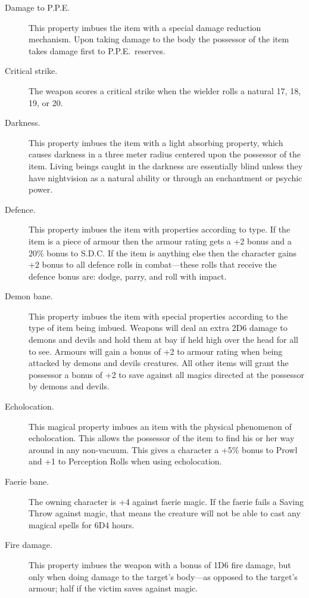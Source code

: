 \begin{description}
\item[Damage to P.P.E.] This property imbues the item with a special damage reduction
mechanism.
Upon taking damage to the body the possessor of
the item takes damage first to P.P.E.\ reserves.

\item[Critical strike.]
The weapon scores a critical strike when the wielder
rolls a natural 17, 18, 19, or 20.

\item[Darkness.] This property imbues the item with a light absorbing property,
which causes darkness in a three meter radius centered upon the possessor of the
item. Living beings caught in the darkness are essentially blind unless they have
nightvision as a natural ability or through an enchantment or psychic power.

\item[Defence.] This property imbues the item with properties according to type.
If the item is a piece of armour then the armour rating gets a +2 bonus and a 20\%
bonus to S.D.C.
If the item is anything else then the character gains +2 bonus to all defence rolls
in combat---these rolls that receive the defence bonus
are: dodge, parry, and roll with impact.

\item[Demon bane.] This property imbues the item with special properties according
to the type of item being imbued.
Weapons will deal an extra 2D6 damage to demons and devils and hold them at bay if
held high over the head for all to see.
Armours will gain a bonus of +2 to armour rating when being attacked by demons and devils
creatures.
All other items will grant the possessor a bonus of +2 to save against all magics
directed at the possessor
by demons and devils.

\item[Echolocation.]
This magical property imbues an item with the
physical phenomenon of echolocation.
This allows the possessor of the item to find
his or her way around in any non-vacuum.
This gives a character a +5\% bonus to Prowl
and +1 to Perception Rolls when using echolocation.

\item[Faerie bane.]
The owning character is +4 against faerie
magic.
If the faerie fails a Saving Throw against
magic, that means the creature will not be
able to cast any magical spells for 6D4 hours.

\item[Fire damage.] This property imbues the weapon with a bonus of 1D6 fire damage,
but only when doing damage to the target's body---as opposed to the target's armour;
half if the victim saves against magic.


\end{description}
